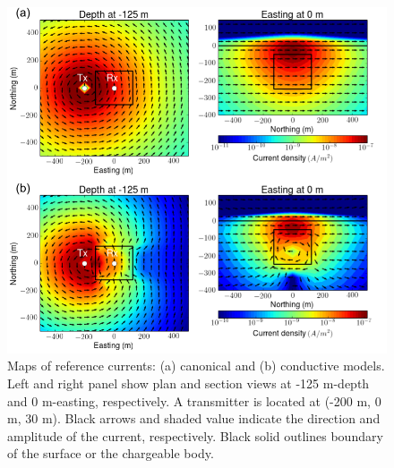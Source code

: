 \documentclass[a4paper, 11pt]{article}
\begin{document}
\begin{figure}[htb]
  \centering
  \includegraphics[width=1\textwidth]{figures/ReferenceCurrent.png}
  \caption{Maps of reference currents: (a) canonical and (b) conductive models. Left and right panel show plan and section views at -125 m-depth and 0 m-easting, respectively. A transmitter is located at (-200 m, 0 m, 30 m). Black arrows and shaded value indicate the direction and amplitude of the current, respectively. Black solid outlines boundary of the surface or the chargeable body.}
  \label{F:ReferenceCurrent}
\end{figure}
\end{document}
